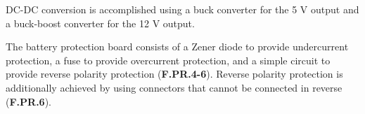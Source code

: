 DC-DC conversion is accomplished using a buck converter for the 5 V output and a buck-boost converter for the 12 V output. 

The battery protection board consists of a Zener diode to provide undercurrent protection, a fuse to provide overcurrent protection, and a simple circuit to provide reverse polarity protection (\textbf{F.PR.4-6}). Reverse polarity protection is additionally achieved by using connectors that cannot be connected in reverse (\textbf{F.PR.6}). 